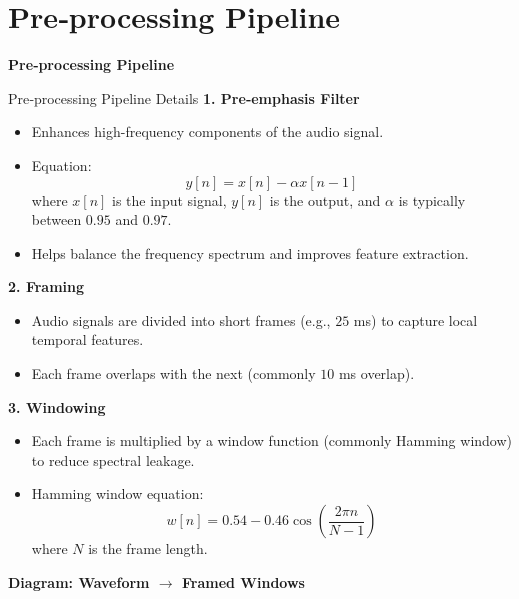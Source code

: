 \section{Pre‑processing Pipeline}
\begin{frame}{}
    \LARGE \textbf{Pre‑processing Pipeline}
\end{frame}

\begin{frame}[allowframebreaks]{Pre‑processing Pipeline Details}
    \textbf{1. Pre‑emphasis Filter}

    \begin{itemize}
        \item Enhances high-frequency components of the audio signal.
        \item Equation:
        \[
            y[n] = x[n] - \alpha x[n-1]
        \]
        where $x[n]$ is the input signal, $y[n]$ is the output, and $\alpha$ is typically between $0.95$ and $0.97$.
        \item Helps balance the frequency spectrum and improves feature extraction.
    \end{itemize}

    \vspace{1em}
    \textbf{2. Framing}

    \begin{itemize}
        \item Audio signals are divided into short frames (e.g., $25$ ms) to capture local temporal features.
        \item Each frame overlaps with the next (commonly $10$ ms overlap).
    \end{itemize}

    \vspace{1em}
    \textbf{3. Windowing}

    \begin{itemize}
        \item Each frame is multiplied by a window function (commonly Hamming window) to reduce spectral leakage.
        \item Hamming window equation:
        \[
            w[n] = 0.54 - 0.46 \cos\left(\frac{2\pi n}{N-1}\right)
        \]
        where $N$ is the frame length.
    \end{itemize}

    \vspace{1em}
    \textbf{Diagram: Waveform $\rightarrow$ Framed Windows}


\end{frame}
